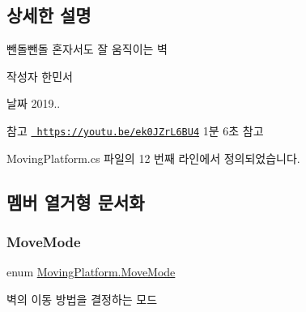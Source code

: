 \subsection{상세한 설명}
뺀돌뺀돌 혼자서도 잘 움직이는 벽 

\begin{DoxyAuthor}{작성자}
한민서 
\end{DoxyAuthor}
\begin{DoxyDate}{날짜}
2019.. 
\end{DoxyDate}
\begin{DoxySeeAlso}{참고}
\href{https://youtu.be/ek0JZrL6BU4}{\texttt{ https\+://youtu.\+be/ek0\+J\+Zr\+L6\+B\+U4}} 1분 6초 참고 
\end{DoxySeeAlso}


Moving\+Platform.\+cs 파일의 12 번째 라인에서 정의되었습니다.



\subsection{멤버 열거형 문서화}
\mbox{\label{class_moving_platform_a7b3427d2906069ecf4c39d69eee53653}} 
\subsubsection{\texorpdfstring{MoveMode}{MoveMode}}
{\footnotesize\ttfamily enum \mbox{\hyperlink{class_moving_platform_a7b3427d2906069ecf4c39d69eee53653}{Moving\+Platform.\+Move\+Mode}}\hspace{0.3cm}{\ttfamily [strong]}}



벽의 이동 방법을 결정하는 모드 

